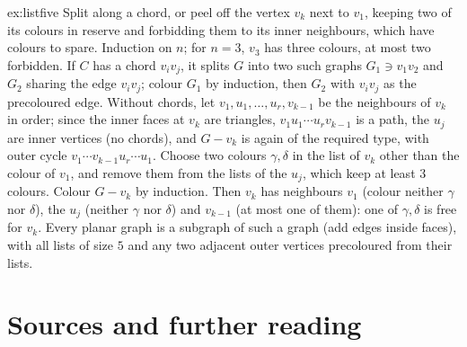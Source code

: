 \begin{solution}{ex:listfive}
\idea Split along a chord, or peel off the vertex $v_k$ next to $v_1$, keeping two of its colours in reserve and forbidding them to its inner neighbours, which have colours to spare.
\writeup Induction on $n$; for $n=3$, $v_3$ has three colours, at most two forbidden. If $C$ has a chord $v_iv_j$, it splits $G$ into two such graphs $G_1\ni v_1v_2$ and $G_2$ sharing the edge $v_iv_j$;
colour $G_1$ by induction, then $G_2$ with $v_iv_j$ as the precoloured edge. Without chords, let $v_1,u_1,\dots,u_r,v_{k-1}$ be the neighbours of $v_k$ in order; since the inner faces at
$v_k$ are triangles, $v_1u_1\cdots u_rv_{k-1}$ is a path, the $u_j$ are inner vertices (no chords), and $G-v_k$ is again of the required type, with outer cycle $v_1\cdots v_{k-1}u_r\cdots u_1$.
Choose two colours $\gamma,\delta$ in the list of $v_k$ other than the colour of $v_1$, and remove them from the lists of the $u_j$, which keep at least $3$ colours. Colour $G-v_k$ by
induction. Then $v_k$ has neighbours $v_1$ (colour neither $\gamma$ nor $\delta$), the $u_j$ (neither $\gamma$ nor $\delta$) and $v_{k-1}$ (at most one of them): one of $\gamma,\delta$ is free for $v_k$. Every
planar graph is a subgraph of such a graph (add edges inside faces), with all lists of size $5$ and any two adjacent outer vertices precoloured from their lists.
\end{solution}

\section*{Sources and further reading}

